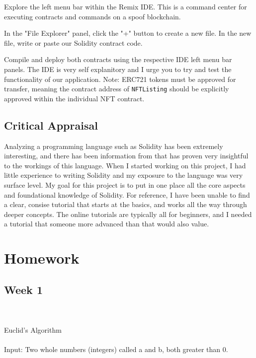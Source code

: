 \documentclass{article}
\theoremstyle{theorem}
\theoremstyle{definition}
\theoremstyle{remark}
\begin{document}
\medskip\noindent
Explore the left menu bar within the Remix IDE. This is a command center for executing contracts and commands on a spoof blockchain. 

\medskip\noindent
In the "File Explorer" panel, click the "+" button to create a new file. In the new file, write or paste our Solidity contract code. 

\medskip\noindent
Compile and deploy both contracts using the respective IDE left menu bar panels. The IDE is very self explanitory and I urge you to try and test the functionality of our application. Note: ERC721 tokens must be approved for transfer, meaning the contract address of \texttt{NFTListing} should be explicitly approved within the individual NFT contract.

\medskip\noindent

\subsection{Critical Appraisal}

Analyzing a programming language such as Solidity has been extremely interesting, and there has been information from \cite{PL} that has proven very insightful to the workings of this language. When I started working on this project, I had little experience to writing Solidity and my exposure to the language was very surface level. My goal for this project is to put in one place all the core aspects and foundational knowledge of Solidity. For reference, I have been unable to find a clear, consise tutorial that starts at the basics, and works all the way through deeper concepts. The online tutorials are typically all for beginners, and I needed a tutorial that someone more advanced than that would also value.

\section{Homework}\label{homework}

\subsection{Week 1}

{\large \\\\Euclid's Algorithm\\\\}
Input: Two whole numbers (integers) called a and b, both greater than 0.
\end{document}
